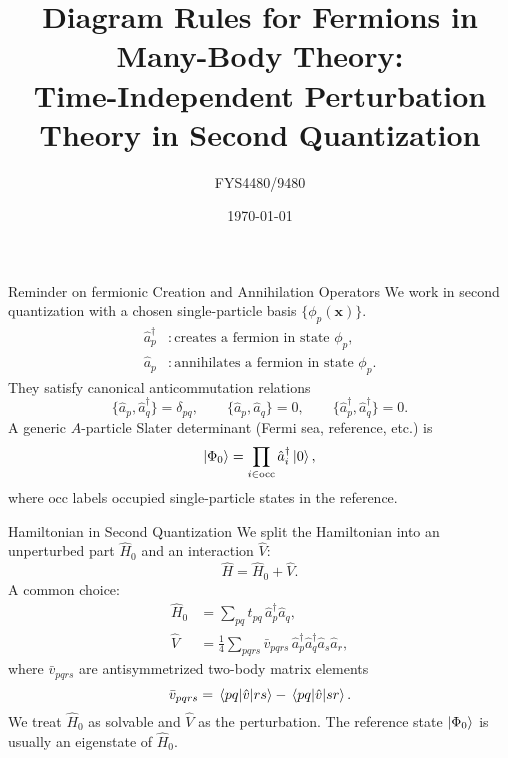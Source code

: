 \documentclass[aspectratio=169]{beamer}
\title[Diagram Rules for Fermions]{Diagram Rules for Fermions in Many-Body Theory:\\
Time-Independent Perturbation Theory in Second Quantization}
\author{FYS4480/9480}
\institute{Addition to lecture notes week 44}
\date{\today}
\begin{document}

\begin{frame}
    \titlepage
\end{frame}


\begin{frame}{Reminder on fermionic Creation and Annihilation Operators}
We work in second quantization with a chosen single-particle basis
$\{ \phi_p(\mathbf{x}) \}$.
\begin{align}
    \hat{a}^\dagger_p &: \text{creates a fermion in state } \phi_p, \\
    \hat{a}_p &: \text{annihilates a fermion in state } \phi_p.
\end{align}
They satisfy canonical anticommutation relations
\begin{equation}
    \{ \hat{a}_p, \hat{a}_q^\dagger \} = \delta_{pq}, \qquad
    \{ \hat{a}_p, \hat{a}_q \} = 0, \qquad
    \{ \hat{a}^\dagger_p, \hat{a}^\dagger_q \} = 0.
\end{equation}
A generic $A$-particle Slater determinant (Fermi sea, reference, etc.) is
\begin{equation}
    \ket{\Phi_0} = \prod_{i \in \text{occ}} \hat{a}^\dagger_i \ket{0},
\end{equation}
where $\text{occ}$ labels occupied single-particle states in the reference.
\end{frame}

\begin{frame}{Hamiltonian in Second Quantization}
We split the Hamiltonian into an unperturbed part $\hat{H}_0$ and an interaction $\hat{V}$:
\begin{equation}
    \hat{H} = \hat{H}_0 + \hat{V}.
\end{equation}
A common choice:
\begin{align}
    \hat{H}_0 &= \sum_{pq} t_{pq} \, \hat{a}^\dagger_p \hat{a}_q, \\
    \hat{V} &= \frac{1}{4} \sum_{pqrs} \bar{v}_{pqrs} \,
        \hat{a}^\dagger_p \hat{a}^\dagger_q \hat{a}_s \hat{a}_r,
\end{align}
where $\bar{v}_{pqrs}$ are antisymmetrized two-body matrix elements
\[
\bar{v}_{pqrs} = \matrixel{pq}{\hat{v}}{rs}
- \matrixel{pq}{\hat{v}}{sr}.
\]
We treat $\hat{H}_0$ as solvable and $\hat{V}$ as the perturbation.
The reference state $\ket{\Phi_0}$ is usually an eigenstate of $\hat{H}_0$.
\end{frame}
\end{document}
